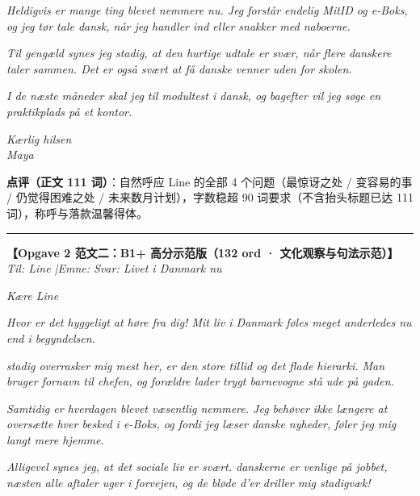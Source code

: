 \begin{answerbox}
\vspace{0.2em}
\textit{Heldigvis er mange ting blevet nemmere nu. Jeg forstår endelig MitID og e-Boks, og jeg tør tale dansk, når jeg handler ind eller snakker med naboerne.}

\vspace{0.2em}
\textit{Til gengæld synes jeg stadig, at den hurtige udtale er svær, når flere danskere taler sammen. Det er også svært at få danske venner uden for skolen.}

\vspace{0.2em}
\textit{I de næste måneder skal jeg til modultest i dansk, og bagefter vil jeg søge en praktikplads på et kontor.}

\vspace{0.2em}
\textit{Kærlig hilsen\\
Maya}

\vspace{0.25em}
\small\textbf{点评（正文 111 词）}：自然呼应 Line 的全部 4 个问题（最惊讶之处 / 变容易的事 / 仍觉得困难之处 / 未来数月计划），字数稳超 90 词要求（不含抬头标题已达 111 词），称呼与落款温馨得体。

\vspace{0.45em}
\hrule
\vspace{0.45em}

\textbf{\color{NCDRed}【Opgave 2 范文二：B1+ 高分示范版（132 ord · 文化观察与句法示范）】}\\
\textit{Til: Line \quad|\quad Emne: Svar: Livet i Danmark nu}

\vspace{0.25em}
\textit{Kære Line}

\vspace{0.2em}
\textit{Hvor er det hyggeligt at høre fra dig! Mit liv i Danmark føles meget anderledes nu end i begyndelsen.}

\vspace{0.2em}
\textit{ stadig overrasker mig mest her, er den store tillid og det flade hierarki. Man bruger fornavn til chefen, og forældre lader trygt barnevogne stå ude på gaden.}

\vspace{0.2em}
\textit{Samtidig er hverdagen blevet væsentlig nemmere. Jeg behøver ikke længere at oversætte hver besked i e-Boks, og fordi jeg læser danske nyheder, føler jeg mig langt mere hjemme.}

\vspace{0.2em}
\textit{Alligevel synes jeg, at det sociale liv er svært.  danskerne er venlige på jobbet,  næsten alle aftaler uger i forvejen, og de bløde d'er driller mig stadigvæk!}


\end{answerbox}
